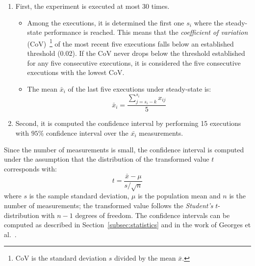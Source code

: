 \begin{enumerate}
\item First, the experiment is executed at most 30 times.
  \begin{itemize}
  \item Among the executions, it is determined the first one \(s_i\) where the steady-state performance is reached. This means that the \textit{coefficient of variation} (CoV)~\footnote{CoV is the standard deviation \(s\) divided by the mean \(\bar{x}\).} of the most recent five {executions} falls below an established threshold (0.02). If the CoV never drops below the threshold established for any five consecutive {executions}, it is considered the five consecutive {executions} with the lowest CoV.
  \item The mean \(\bar{x}_i\) of the last five {executions} under steady-state is:
    \begin{equation*}
      \bar{x}_i = \frac{\sum^{s_i}_{j=s_i - k}x_{ij}}{5}
    \end{equation*}
  \end{itemize}
\item Second, it is computed the confidence interval by performing 15 {executions} with \(95\%\) confidence interval over the \(\bar{x_i}\) measurements.

\end{enumerate}

Since the number of measurements is small, the confidence interval is computed under the assumption that the distribution of the transformed value \(t\) corresponds with:
\begin{equation*}
  t = \frac{\bar{x} - \mu}{s/\sqrt{n}}
\end{equation*}
where \(s\) is the sample standard deviation, \(\mu\) is the population mean and \(n\) is the number of measurements; the transformed value follows the \textit{Student's} \(t\)-distribution with \(n - 1\) degrees of freedom. The confidence intervals can be computed as described in Section~\ref{subsec:statistics} and in the work of Georges et al.~\cite{DBLP_conf_oopsla_GeorgesBE07}.
